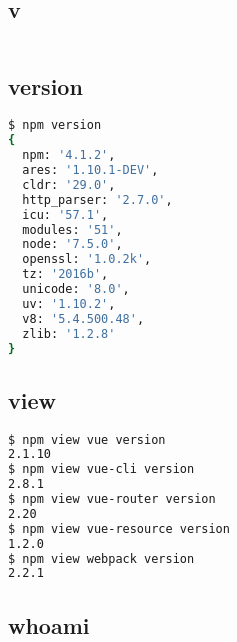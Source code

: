 \subsection{v}





\begin{lstlisting}[language=bash]

\end{lstlisting}

\subsection{version}

\begin{lstlisting}[language=bash]
$ npm version
{
  npm: '4.1.2',
  ares: '1.10.1-DEV',
  cldr: '29.0',
  http_parser: '2.7.0',
  icu: '57.1',
  modules: '51',
  node: '7.5.0',
  openssl: '1.0.2k',
  tz: '2016b',
  unicode: '8.0',
  uv: '1.10.2',
  v8: '5.4.500.48',
  zlib: '1.2.8' 
}
\end{lstlisting}

\subsection{view}


\begin{lstlisting}[language=bash]
$ npm view vue version
2.1.10
$ npm view vue-cli version
2.8.1
$ npm view vue-router version
2.20
$ npm view vue-resource version
1.2.0
$ npm view webpack version
2.2.1
\end{lstlisting}

\subsection{whoami}



\begin{lstlisting}[language=bash]

\end{lstlisting}




\begin{lstlisting}[language=bash]

\end{lstlisting}




\begin{lstlisting}[language=bash]

\end{lstlisting}





